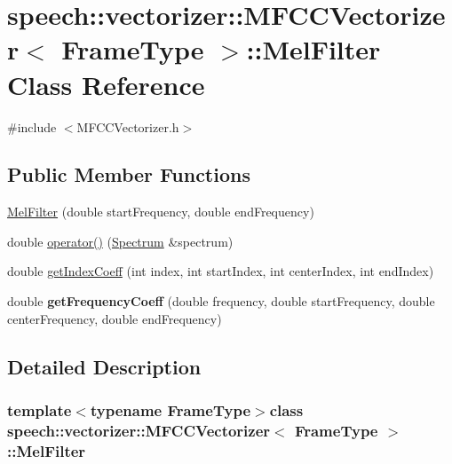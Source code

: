 \hypertarget{classspeech_1_1vectorizer_1_1MFCCVectorizer_1_1MelFilter}{\section{speech\+:\+:vectorizer\+:\+:M\+F\+C\+C\+Vectorizer$<$ Frame\+Type $>$\+:\+:Mel\+Filter Class Reference}
\label{classspeech_1_1vectorizer_1_1MFCCVectorizer_1_1MelFilter}
}


{\ttfamily \#include $<$M\+F\+C\+C\+Vectorizer.\+h$>$}

\subsection*{Public Member Functions}
\begin{DoxyCompactItemize}
\item 
\hyperlink{classspeech_1_1vectorizer_1_1MFCCVectorizer_1_1MelFilter_a406c5493a1eaeea4586c372ddb0dbd5c}{Mel\+Filter} (double start\+Frequency, double end\+Frequency)
\item 
double \hyperlink{classspeech_1_1vectorizer_1_1MFCCVectorizer_1_1MelFilter_a332be225c09e3c12e2a05f9a61401e96}{operator()} (\hyperlink{classspeech_1_1raw__data_1_1Spectrum}{Spectrum} \&spectrum)
\item 
double \hyperlink{classspeech_1_1vectorizer_1_1MFCCVectorizer_1_1MelFilter_a024b85d403d333f6f7649e11de0bf257}{get\+Index\+Coeff} (int index, int start\+Index, int center\+Index, int end\+Index)
\item 
\hypertarget{classspeech_1_1vectorizer_1_1MFCCVectorizer_1_1MelFilter_af41ba8e8dc53e80cbaf45509874e7655}{double {\bfseries get\+Frequency\+Coeff} (double frequency, double start\+Frequency, double center\+Frequency, double end\+Frequency)}\label{classspeech_1_1vectorizer_1_1MFCCVectorizer_1_1MelFilter_af41ba8e8dc53e80cbaf45509874e7655}

\end{DoxyCompactItemize}


\subsection{Detailed Description}
\subsubsection*{template$<$typename Frame\+Type$>$class speech\+::vectorizer\+::\+M\+F\+C\+C\+Vectorizer$<$ Frame\+Type $>$\+::\+Mel\+Filter}

